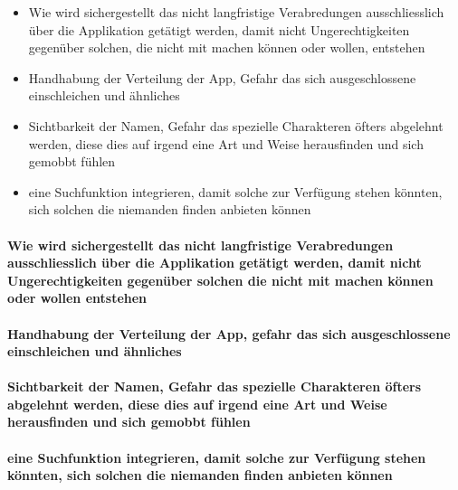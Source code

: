 \begin{itemize}
\item Wie wird sichergestellt das nicht langfristige Verabredungen ausschliesslich über die Applikation getätigt werden, damit nicht Ungerechtigkeiten gegenüber solchen, die nicht mit machen können oder wollen, entstehen
\item Handhabung der Verteilung der App, Gefahr das sich ausgeschlossene einschleichen und ähnliches
\item Sichtbarkeit der Namen, Gefahr das spezielle Charakteren öfters abgelehnt werden, diese dies auf irgend eine Art und Weise herausfinden und sich gemobbt fühlen
\item eine Suchfunktion integrieren, damit solche zur Verfügung stehen könnten, sich solchen die niemanden finden anbieten können
\end{itemize}

\paragraph{Wie wird sichergestellt das nicht langfristige Verabredungen ausschliesslich über die Applikation getätigt werden, damit nicht Ungerechtigkeiten gegenüber solchen die nicht mit machen können oder wollen entstehen}
\vspace{3cm} 

\paragraph{Handhabung der Verteilung der App, gefahr das sich ausgeschlossene einschleichen und ähnliches}
\vspace{3cm} 

\paragraph{Sichtbarkeit der Namen, Gefahr das spezielle Charakteren öfters abgelehnt werden, diese dies auf irgend eine Art und Weise herausfinden und sich gemobbt fühlen}
\vspace{3cm} 

\paragraph{eine Suchfunktion integrieren, damit solche zur Verfügung stehen könnten, sich solchen die niemanden finden anbieten können}
\vspace{3cm} 
